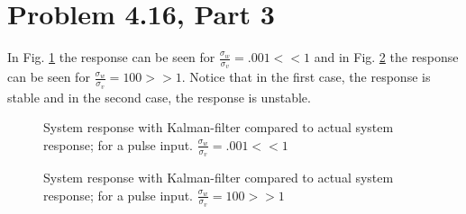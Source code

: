 \documentclass[paper=a4, fontsize=11pt]{scrartcl}
\numberwithin{equation}{section}		%
\numberwithin{figure}{section}			%
\numberwithin{table}{section}				%
\begin{document}
\section*{Problem 4.16, Part 3}

In Fig. \ref{fig:f41} the response can be seen for $\frac{\sigma_w}{\sigma_v} =  .001 << 1$ and in Fig. \ref{fig:f40} the response can be seen for $\frac{\sigma_w}{\sigma_v} =  100 >> 1$. Notice that in the first case, the response is stable and in the second case, the response is unstable. 
\begin{figure}
	\centering
    
	\caption{System response with Kalman-filter compared to actual system response; for a pulse input. $\frac{\sigma_w}{\sigma_v} =  .001 << 1$ \label{fig:f41}}
\end{figure}

\begin{figure}
	\centering
    
	\caption{System response with Kalman-filter compared to actual system response; for a pulse input. $\frac{\sigma_w}{\sigma_v} =  100 >> 1$ \label{fig:f40}}
\end{figure}
\end{document}
